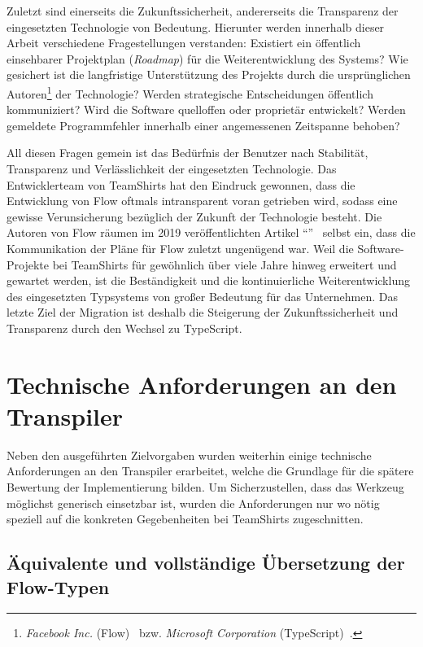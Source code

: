 Zuletzt sind einerseits die Zukunftssicherheit, andererseits die Transparenz der eingesetzten Technologie von Bedeutung. Hierunter werden innerhalb dieser Arbeit verschiedene Fragestellungen verstanden: Existiert ein öffentlich einsehbarer Projektplan (\textit{Roadmap}) für die Weiterentwicklung des Systems? Wie gesichert ist die langfristige Unterstützung des Projekts durch die ursprünglichen Autoren\footnote{\textit{Facebook Inc.} (Flow)~\autocite{FLOW:PAPER} bzw. \emph{Microsoft Corporation} (TypeScript)~\autocite{TYPESCRIPT:SPEC}.} der Technologie? Werden strategische Entscheidungen öffentlich kommuniziert? Wird die Software quelloffen oder proprietär entwickelt? Werden gemeldete Programmfehler innerhalb einer angemessenen Zeitspanne behoben?

All diesen Fragen gemein ist das Bedürfnis der Benutzer nach Stabilität, Transparenz und Verlässlichkeit der eingesetzten Technologie. Das Entwicklerteam von TeamShirts hat den Eindruck gewonnen, dass die Entwicklung von Flow oftmals intransparent voran getrieben wird, sodass eine gewisse Verunsicherung bezüglich der Zukunft der Technologie besteht. Die Autoren von Flow räumen im 2019 veröffentlichten Artikel \enquote{}~\autocite{FLOW:UPDATE_2019} selbst ein, dass die Kommunikation der Pläne für Flow zuletzt ungenügend war. Weil die Software-Projekte bei TeamShirts für gewöhnlich über viele Jahre hinweg erweitert und gewartet werden, ist die Beständigkeit und die kontinuierliche Weiterentwicklung des eingesetzten Typsystems von großer Bedeutung für das Unternehmen. Das letzte Ziel der Migration ist deshalb die Steigerung der Zukunftssicherheit und Transparenz durch den Wechsel zu TypeScript.

\section{Technische Anforderungen an den Transpiler}
\label{sec:requirements}

Neben den ausgeführten Zielvorgaben wurden weiterhin einige technische Anforderungen an den Transpiler erarbeitet, welche die Grundlage für die spätere Bewertung der Implementierung bilden. Um Sicherzustellen, dass das Werkzeug möglichst generisch einsetzbar ist, wurden die Anforderungen nur wo nötig speziell auf die konkreten Gegebenheiten bei TeamShirts zugeschnitten.

\subsection{Äquivalente und vollständige Übersetzung der Flow-Typen}
\label{sec:requirement:completeness}

